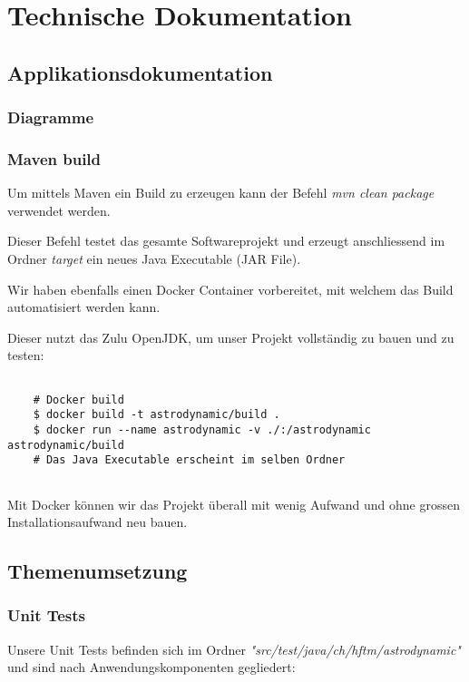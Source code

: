 \chapter{Technische Dokumentation}

\section{Applikationsdokumentation}

\subsection{Diagramme}

\subsection{Maven build}

Um mittels Maven ein Build zu erzeugen kann der Befehl \textit{mvn clean package} verwendet werden.

Dieser Befehl testet das gesamte Softwareprojekt und erzeugt anschliessend im Ordner \textit{target} ein neues Java Executable (JAR File).

Wir haben ebenfalls einen Docker Container vorbereitet, mit welchem das Build automatisiert werden kann.

Dieser nutzt das Zulu OpenJDK, um unser Projekt vollständig zu bauen und zu testen:

\begin{lstlisting}

	# Docker build
	$ docker build -t astrodynamic/build .
	$ docker run --name astrodynamic -v ./:/astrodynamic astrodynamic/build
	# Das Java Executable erscheint im selben Ordner
	
\end{lstlisting}

Mit Docker können wir das Projekt überall mit wenig Aufwand und ohne grossen Installationsaufwand neu bauen.

\section{Themenumsetzung}

\subsection{Unit Tests}

Unsere Unit Tests befinden sich im Ordner \textit{"src/test/java/ch/hftm/astrodynamic"} und sind nach Anwendungskomponenten gegliedert:

